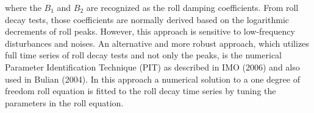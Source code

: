 




where the $B_1$ and $B_2$ are recognized as the roll damping coefficients.
From roll decay tests, those coefficients are normally derived based on the logarithmic decrements of roll peaks. However, this approach is sensitive to low-frequency disturbances and noises. An alternative and more robust approach, which utilizes full time series of roll decay tests and not only the peaks, is the numerical Parameter Identification Technique (PIT) as described in IMO (2006) and also used in Bulian (2004). In this approach a numerical solution to a one degree of freedom roll equation is fitted to the roll decay time series by tuning the parameters in the roll equation.



%